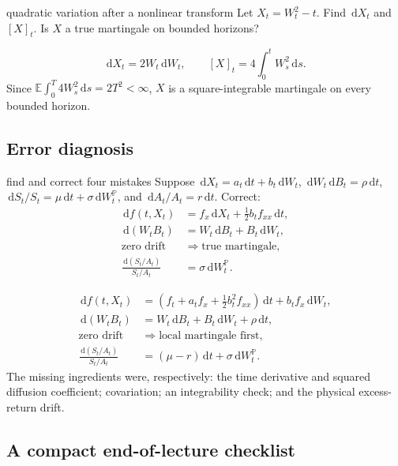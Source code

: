 \documentclass[10pt]{article}
\newcommand{\E}{\mathbb E}
\newcommand{\Pp}{\mathbb P}
\newcommand{\1}{\mathbf 1}
\newcommand{\dd}{\,\mathrm d}
\theoremstyle{definition}
\begin{document}
\begin{studentexercise}{quadratic variation after a nonlinear transform}
Let \(X_t=W_t^2-t\). Find \(\dd X_t\) and \([X]_t\). Is \(X\) a true
martingale on bounded horizons?
\end{studentexercise}
\begin{shortsolution}
\[
\dd X_t=2W_t\dd W_t,
\qquad
\boxed{[X]_t=4\int_0^tW_s^2\dd s.}
\]
Since \(\E\int_0^T4W_s^2\dd s=2T^2<\infty\), \(X\) is a square-integrable
martingale on every bounded horizon.
\end{shortsolution}

\subsection{Error diagnosis}

\begin{studentexercise}{find and correct four mistakes}
Suppose
\(\dd X_t=a_t\dd t+b_t\dd W_t\),
\(\dd W_t\dd B_t=\rho\dd t\),
\(\dd S_t/S_t=\mu\dd t+\sigma\dd W_t^{\Pp}\), and
\(\dd A_t/A_t=r\dd t\). Correct:
\[
\begin{aligned}
\dd f(t,X_t)
&=f_x\dd X_t+\frac12b_tf_{xx}\dd t,\\
\dd(W_tB_t)
&=W_t\dd B_t+B_t\dd W_t,\\
\text{zero drift}
&\Longrightarrow\text{true martingale},\\
\frac{\dd(S_t/A_t)}{S_t/A_t}
&=\sigma\dd W_t^{\Pp}.
\end{aligned}
\]
\end{studentexercise}
\begin{shortsolution}
\[
\begin{aligned}
\dd f(t,X_t)
&=\left(f_t+a_tf_x+\frac12b_t^2f_{xx}\right)\dd t
+b_tf_x\dd W_t,\\
\dd(W_tB_t)
&=W_t\dd B_t+B_t\dd W_t+\rho\dd t,\\
\text{zero drift}
&\Longrightarrow\text{local martingale first},\\
\frac{\dd(S_t/A_t)}{S_t/A_t}
&=(\mu-r)\dd t+\sigma\dd W_t^{\Pp}.
\end{aligned}
\]
The missing ingredients were, respectively: the time derivative and squared
diffusion coefficient; covariation; an integrability check; and the
physical excess-return drift.
\end{shortsolution}

\subsection{A compact end-of-lecture checklist}
\end{document}
